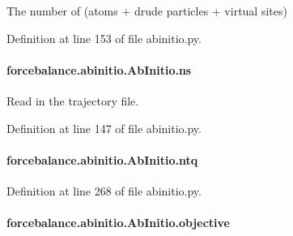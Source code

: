 The number of (atoms + drude particles + virtual sites) 



Definition at line 153 of file abinitio.\-py.

\hypertarget{classforcebalance_1_1abinitio_1_1AbInitio_a1e8248e2efe952362b1b21462a70b540}{
\paragraph[{ns}]{\setlength{\rightskip}{0pt plus 5cm}forcebalance.\-abinitio.\-Ab\-Initio.\-ns\hspace{0.3cm}{\ttfamily [inherited]}}}\label{classforcebalance_1_1abinitio_1_1AbInitio_a1e8248e2efe952362b1b21462a70b540}


Read in the trajectory file. 



Definition at line 147 of file abinitio.\-py.

\hypertarget{classforcebalance_1_1abinitio_1_1AbInitio_af8a895f61ddea6b9ca2765ddbf309a75}{
\paragraph[{ntq}]{\setlength{\rightskip}{0pt plus 5cm}forcebalance.\-abinitio.\-Ab\-Initio.\-ntq\hspace{0.3cm}{\ttfamily [inherited]}}}\label{classforcebalance_1_1abinitio_1_1AbInitio_af8a895f61ddea6b9ca2765ddbf309a75}


Definition at line 268 of file abinitio.\-py.

\hypertarget{classforcebalance_1_1abinitio_1_1AbInitio_acbbd447b9f66bc4699992f3b64bb256d}{
\paragraph[{objective}]{\setlength{\rightskip}{0pt plus 5cm}forcebalance.\-abinitio.\-Ab\-Initio.\-objective\hspace{0.3cm}{\ttfamily [inherited]}}}\label{classforcebalance_1_1abinitio_1_1AbInitio_acbbd447b9f66bc4699992f3b64bb256d}


